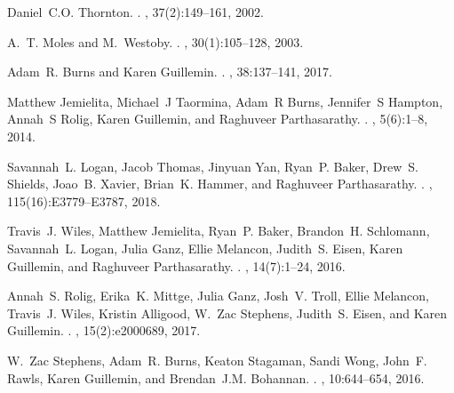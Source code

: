 \begin{thebibliography}{10}
	Daniel~C.O. Thornton.
	.
	, 37(2):149--161, 2002.
	
	A.~T. Moles and M.~Westoby.
	.
	, 30(1):105--128, 2003.
	
	Adam~R. Burns and Karen Guillemin.
	.
	, 38:137--141, 2017.
	
	Matthew Jemielita, Michael~J Taormina, Adam~R Burns, Jennifer~S Hampton,
	Annah~S Rolig, Karen Guillemin, and Raghuveer Parthasarathy.
	.
	, 5(6):1--8, 2014.
	
	Savannah~L. Logan, Jacob Thomas, Jinyuan Yan, Ryan~P. Baker, Drew~S. Shields,
	Joao~B. Xavier, Brian~K. Hammer, and Raghuveer Parthasarathy.
	.
	,
	115(16):E3779--E3787, 2018.
	
	Travis~J. Wiles, Matthew Jemielita, Ryan~P. Baker, Brandon~H. Schlomann,
	Savannah~L. Logan, Julia Ganz, Ellie Melancon, Judith~S. Eisen, Karen
	Guillemin, and Raghuveer Parthasarathy.
	.
	, 14(7):1--24, 2016.
	
	Annah~S. Rolig, Erika~K. Mittge, Julia Ganz, Josh~V. Troll, Ellie Melancon,
	Travis~J. Wiles, Kristin Alligood, W.~Zac Stephens, Judith~S. Eisen, and
	Karen Guillemin.
	.
	, 15(2):e2000689, 2017.
	
	W.~Zac Stephens, Adam~R. Burns, Keaton Stagaman, Sandi Wong, John~F. Rawls,
	Karen Guillemin, and Brendan~J.M. Bohannan.
	.
	, 10:644--654, 2016.
	

\end{thebibliography}
